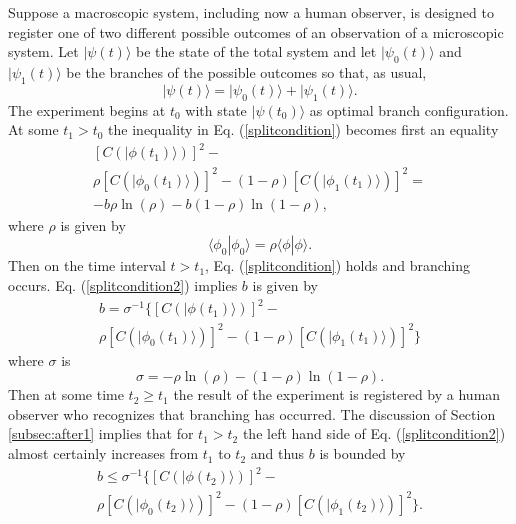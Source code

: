 \documentclass[12pt,amsmath,amssymb,onecolumn]{revtex4-2}
\begin{document}
Suppose a macroscopic system, including
now a human observer, is designed
to register one of two different possible outcomes
of an observation of a microscopic system.
Let $|\psi(t) \rangle $ be the state of the total system
and let $|\psi_0(t) \rangle $ and $|\psi_1(t) \rangle $ be the branches
of the possible outcomes so that, as usual,
\begin{equation}
  \label{humanobserver}
  |\psi(t) \rangle  = |\psi_0(t) \rangle  + |\psi_1(t) \rangle .
\end{equation}
The experiment begins at $t_0$ with
state $|\psi(t_0) \rangle $ as optimal branch
configuration.
At some $t_1 > t_0$ the inequality in Eq. (\ref{splitcondition}) becomes
first an equality
\begin{multline}\label{splitcondition2}
  [C( |\phi(t_1) \rangle )]^2 - \\
  \rho [C( |\phi_0(t_1) \rangle )]^2 - ( 1 - \rho) [C( |\phi_1(t_1) \rangle )]^2 = \\
-b \rho \ln( \rho) - b ( 1 - \rho) \ln( 1 - \rho),
\end{multline}
where $\rho$ is given by
\begin{equation}
    \label{defofrho1}
     \langle  \phi_0 | \phi_0 \rangle  = \rho  \langle  \phi | \phi \rangle .
\end{equation}
Then on the time interval $t > t_1$,
Eq. (\ref{splitcondition}) holds 
and branching occurs. 
Eq. (\ref{splitcondition2}) implies $b$ is given by
\begin{multline}
  \label{splitcondition4}
  b = \sigma^{-1} \{  [C( |\phi(t_1) \rangle )]^2 - \\
  \rho [C( |\phi_0(t_1) \rangle )]^2 - ( 1 - \rho) [C( |\phi_1(t_1) \rangle )]^2 \}
\end{multline}
where $\sigma$ is
\begin{equation}
  \label{defsigma}
  \sigma =   -\rho \ln( \rho) - ( 1 - \rho) \ln( 1 - \rho).  
\end{equation}
Then at some time $t_2 \ge t_1$ the result of
the experiment is registered by a human observer
who recognizes that branching has occurred.
The discussion of Section \ref{subsec:after1} 
implies that for $t_1 > t_2$  the left hand side of Eq. (\ref{splitcondition2})
almost certainly increases from $t_1$ to $t_2$ and
thus $b$ is bounded by
\begin{multline}
  \label{splitcondition5}
  b \le \sigma^{-1}  \{ [C( |\phi(t_2) \rangle )]^2 - \\
  \rho [C( |\phi_0(t_2) \rangle )]^2 - ( 1 - \rho) [C( |\phi_1(t_2) \rangle )]^2 \}.
\end{multline}
\end{document}
